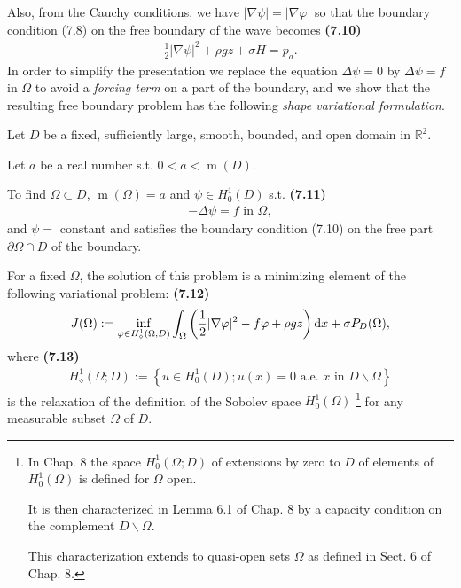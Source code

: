 \documentclass{book}
\numberwithin{equation}{section}
\begin{document}
\begin{enumerate}
    Also, from the Cauchy conditions, we have $|\nabla\psi| = |\nabla\varphi|$ so that the boundary condition (7.8) on the free boundary of the wave becomes \textbf{(7.10)}
    \begin{align*}
        \frac{1}{2}|\nabla\psi|^2 + \rho gz + \sigma H = p_a.
    \end{align*}
    In order to simplify the presentation we replace the equation $\Delta\psi = 0$ by $\Delta\psi = f$ in $\Omega$ to avoid a \textit{forcing term} on a part of the boundary, and we show that the resulting free boundary problem has the following \textit{shape variational formulation}.
    
    Let $D$ be a fixed, sufficiently large, smooth, bounded, and open domain in $\mathbb{R}^2$.
    
    Let $a$ be a real number s.t. $0 < a < \operatorname{m}(D)$.
    
    To find $\Omega\subset D$, $\operatorname{m}(\Omega) = a$ and $\psi\in H_0^1(D)$ s.t. \textbf{(7.11)}
    \begin{align*}
        -\Delta\psi = f \mbox{ in } \Omega,
    \end{align*}
    and $\psi =$ constant and satisfies the boundary condition (7.10) on the free part $\partial\Omega\cap D$ of the boundary.
    
    For a fixed $\Omega$, the solution of this problem is a minimizing element of the following variational problem: \textbf{(7.12)}
    \begin{align*}
        J(\Omega) := \inf_{\varphi\in H_\diamond^1(\Omega;D)} \int_\Omega \left(\frac{1}{2}|\nabla\varphi|^2 - f\varphi + \rho gz\right){\rm d}x + \sigma P_D(\Omega),
    \end{align*}
    where \textbf{(7.13)}
    \begin{align*}
        H_\diamond^1(\Omega;D) := \left\{u\in H_0^1(D);u(x) = 0 \mbox{ a.e. } x \mbox{ in } D\backslash\Omega\right\}
    \end{align*}
    is the relaxation of the definition of the Sobolev space $H_0^1(\Omega)$ \footnote{In Chap. 8 the space $H_0^1(\Omega;D)$ of extensions by zero to $D$ of elements of $H_0^1(\Omega)$ is defined for $\Omega$ open.
        
        It is then characterized in Lemma 6.1 of Chap. 8 by a capacity condition on the complement $D\backslash\Omega$.
        
        This characterization extends to quasi-open sets $\Omega$ as defined in Sect. 6 of Chap. 8.} for any measurable subset $\Omega$ of $D$.
    

\end{enumerate}
\end{document}
